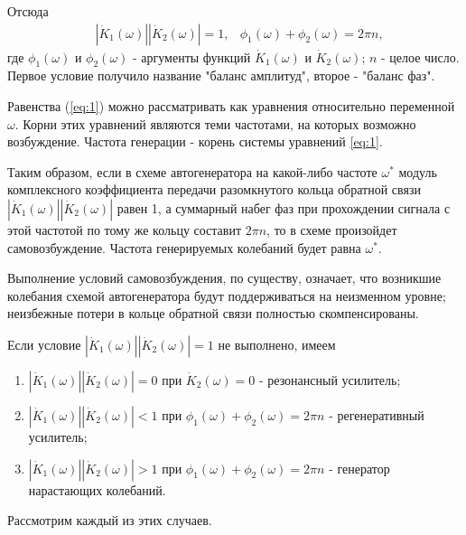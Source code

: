 Отсюда 
\begin{equation}
\begin{aligned}
& |\dot{K}_1(\omega)||\dot{K}_2(\omega)|=1, & \phi_1(\omega)+\phi_2(\omega)=2\pi n,
\end{aligned}
\label{eq:1}
\end{equation}
где $\phi_1(\omega)$ и $\phi_2(\omega)$ - аргументы функций $\dot{K}_1(\omega)$ и $\dot{K}_2(\omega)$; $n$ - целое число. Первое условие получило название "баланс амплитуд", второе - "баланс фаз".

Равенства (\ref{eq:1}) можно рассматривать как уравнения относительно переменной $\omega$. Корни этих уравнений являются теми частотами, на которых возможно возбуждение. Частота генерации - корень системы уравнений \eqref{eq:1}.

Таким образом, если в схеме автогенератора на какой-либо частоте $\omega^*$ модуль комплексного коэффициента передачи разомкнутого кольца обратной связи $|\dot{K}_1(\omega)||\dot{K}_2(\omega)|$ равен 1, а суммарный набег фаз при прохождении сигнала с этой частотой по тому же кольцу составит $2\pi n$, то в схеме произойдет самовозбуждение. Частота генерируемых колебаний будет равна $\omega^*$.

Выполнение условий самовозбуждения, по существу, означает, что возникшие колебания схемой автогенератора будут поддерживаться на неизменном уровне; неизбежные потери в кольце обратной связи полностью скомпенсированы.

Если условие $|\dot{K}_1(\omega)||\dot{K}_2(\omega)|=1$ не выполнено, имеем
\begin{enumerate}
\item {
	$|\dot{K}_1(\omega)||\dot{K}_2(\omega)|=0$ при $\dot{K}_2(\omega)=0$ - резонансный усилитель;
}
\item {
	$|\dot{K}_1(\omega)||\dot{K}_2(\omega)|<1$ при $\phi_1(\omega)+\phi_2(\omega)=2\pi n$ - регенеративный усилитель;
}
\item {
	$|\dot{K}_1(\omega)||\dot{K}_2(\omega)|>1$ при $\phi_1(\omega)+\phi_2(\omega)=2\pi n$ - генератор нарастающих колебаний.
}
\end{enumerate}
Рассмотрим каждый из этих случаев.

